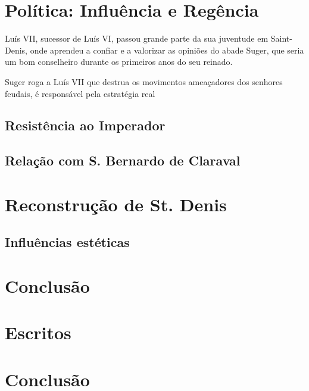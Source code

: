 \documentclass{article}
\begin{document}
\section{Política: Influência e Regência}

Luís VII, sucessor de Luís VI, passou grande parte da sua juventude em
Saint-Denis, onde aprendeu a confiar e a valorizar as opiniões do
abade Suger, que seria um bom conselheiro durante os primeiros anos do
seu reinado.

Suger roga a Luís VII que destrua os movimentos ameaçadores dos
senhores feudais, é responsável pela estratégia real 

\subsection{Resistência ao Imperador}

\subsection{Relação com S. Bernardo de Claraval}

\section{Reconstrução de St. Denis}

\subsection{Influências estéticas}

\section{Conclusão}


\section{Escritos}

\section{Conclusão}

\printbibliography[heading=bibliography,title={Bibliografia},type=book]
\end{document}
